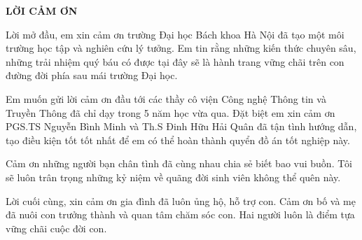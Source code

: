 \documentclass[../DoAn.tex]{subfiles}
\begin{document}
\begin{center}
    \Large{\textbf{LỜI CẢM ƠN}}\\
\end{center}
\vspace{1cm}
Lời mở đầu, em xin cảm ơn trường Đại học Bách khoa Hà Nội đã tạo một môi trường học tập và nghiên cứu lý tưởng. Em tin rằng những kiến thức chuyên sâu, những trải nhiệm quý báu có được tại đây sẽ là hành trang vững chãi trên con đường đời phía sau mái trường Đại học.

Em muốn gửi lời cảm ơn đầu tới các thầy cô viện Công nghệ Thông tin và Truyền Thông đã chỉ dạy trong 5 năm học vừa qua. Đặt biệt em xin cảm ơn PGS.TS Nguyễn Bình Minh và Th.S Đinh Hữu Hải Quân đã tận tình hướng dẫn, tạo điều kiện tốt tốt nhất để em có thể hoàn thành quyển đồ án tốt nghiệp này.

Cảm ơn những người bạn chân tình đã cùng nhau chia sẻ biết bao vui buồn. Tôi sẽ luôn trân trọng những kỷ niệm về quãng đời sinh viên không thể quên này.

Lời cuối cùng, xin cảm ơn gia đình đã luôn ủng hộ, hỗ trợ con. Cảm ơn bố và mẹ đã nuôi con trưởng thành và quan tâm chăm sóc con. Hai người luôn là điểm tựa vững chãi cuộc đời con.
\end{document}
